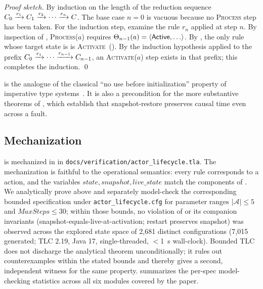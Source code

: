 \begin{proof}[Proof sketch]
By induction on the length of the reduction sequence
\(C_0 \xrightarrow{r_1} C_1 \xrightarrow{r_2} \cdots \xrightarrow{r_n} C\).
The base case \(n = 0\) is vacuous because no \textsc{Process}
step has been taken.  For the induction step, examine the rule
\(r_n\) applied at step \(n\).  By inspection of ,
\textsc{Process}(\(a\)) requires
\(\Theta_{n-1}(a) = \langle \mathsf{Active}{}, \ldots\rangle\).  By
, the only rule whose target state is
\Active{} is \textsc{Activate}~().  By the
induction hypothesis applied to the prefix
\(C_0 \xrightarrow{r_1} \cdots \xrightarrow{r_{n-1}} C_{n-1}\), an
\textsc{Activate}(\(a\)) step exists in that prefix; this completes
the induction.
\qed
\end{proof}

 is the analogue of the classical
``no use before initialization'' property of imperative type
systems~\citep{wright1994syntactic}.  It is also a precondition for
the more substantive theorems of , which
establish that snapshot-restore preserves causal time even across a
fault.

\subsection{Mechanization}
\label{sec:model:mechanization}

 is mechanized in \TLA{} in
\texttt{docs/verification/actor\_lifecycle.tla}.  The mechanization
is faithful to the operational semantics: every rule corresponds to
a \TLA{} action, and the variables \(\mathit{state},
\mathit{snapshot}, \mathit{live\_state}\) match the components of
.  We analytically prove
 above and separately model-check the
corresponding bounded \TLA{} specification under
\texttt{actor\_lifecycle.cfg} for parameter ranges
\(|\mathcal{A}| \le 5\) and \(\mathit{MaxSteps} \le 30\); within
those bounds, no violation of  or its
companion invariants (snapshot-equals-live-at-activation; restart
preserves snapshot) was observed across the explored state space of
2{,}681 distinct configurations (7{,}015 generated; TLC
2.19, Java 17, single-threaded, $<$1~s wall-clock).  Bounded TLC
does not discharge the analytical theorem unconditionally; it rules
out counterexamples within the stated bounds and thereby gives a
second, independent witness for the same property.
 summarizes the per-spec model-checking
statistics across all six \TLA{} modules covered by the paper.
